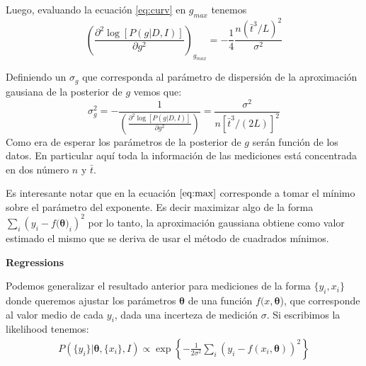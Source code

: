 \documentclass[aps,onecolumn,12pt,notitlepage]{revtex4-1}
\begin{document}
Luego, evaluando la ecuación \ref{eq:curv} en $g_{max}$ tenemos
\begin{equation}
\left(\frac{\partial^2 \log\left[P(g|D,I)\right] }{\partial g^2}\right)_{g_{max}} = -\frac{1}{4} \frac{n \left(\bar{t}^3/L\right)^2}{\sigma^2} 
\end{equation}

Definiendo un $\sigma_{g}$ que corresponda al parámetro de dispersión de la aproximación gausiana de la posterior de $g$ vemos que:
\begin{equation}
\displaystyle \sigma^{2}_{g} = -\frac{1}{\left(\frac{\partial^2 \log\left[P(g|D,I)\right] }{\partial g^2}\right)}  = \frac{\sigma^2}{n\left[\bar{t}^3/(2L)\right]^2}
\end{equation}
Como era de esperar los parámetros de la posterior de $g$ serán función de los datos. En particular aquí toda la información de las mediciones está concentrada en dos número $n$ y $\bar{t}$.


Es interesante notar que en la ecuación $\ref{eq:max}$ corresponde a tomar el mínimo sobre el parámetro del exponente. Es decir maximizar algo de la forma $ \sum_{i}\left(y_{i} -f(\boldsymbol{\theta)}_{i} \right)^2$ por lo tanto, la aproximación gaussiana obtiene como valor estimado el mismo que se deriva de usar el método de cuadrados mínimos. 

\textbf{Regressions}

Podemos generalizar el resultado anterior para mediciones de la forma $\{y_{i},x_{i}\}$ donde queremos ajustar los parámetros $\boldsymbol{\theta}$ de una función $f(x,\boldsymbol{\theta}$), que corresponde al valor medio de cada $y_{i}$, dada una incerteza de medición $\sigma$. Si escribimos la likelihood tenemos:
\begin{align}
P(\{y_{i}\}|\boldsymbol{\theta},\{x_{i}\},I) \propto \exp \left\{-\frac{1}{2\sigma^2} \sum_{i} \left(y_{i}-f(x_{i},\boldsymbol{\theta})\right)^{2}\right\}
\end{align}
\end{document}
